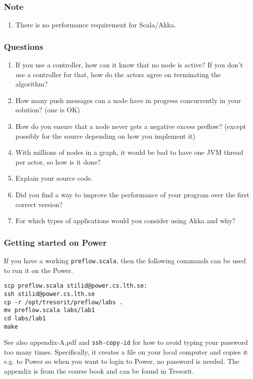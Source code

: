 \documentclass{forsete}
\begin{document}
\subsubsection*{Note}
\begin{enumerate}
\item There is no performance requirement for Scala/Akka.
\end{enumerate}

\subsubsection*{Questions}
\begin{enumerate}
\item If you use a controller, how can it know that no node is active? If you don't use a controller for that, how do the actors agree on
terminating the algorithm?
\item How many push messages can a node have in progress concurrently in your solution? (one is OK)
\item How do you ensure that a node never gets a negative excess preflow? (except possibly for the source depending on how you implement it)
\item With millions of nodes in a graph, it would be bad to have one JVM thread per actor, so how is it done?
\item Explain your source code.
\item Did you find a way to improve the performance of your program over the first correct version?
\item For which types of applications would you consider using Akka and why?
\end{enumerate}

\subsubsection*{Getting started on Power}
If you have a working \verb!preflow.scala!, then the following commands can be used to run it on the Power.
\begin{verbatim}
scp preflow.scala stilid@power.cs.lth.se:
ssh stilid@power.cs.lth.se
cp -r /opt/tresorit/preflow/labs .
mv preflow.scala labs/lab1
cd labs/lab1
make
\end{verbatim}

See also appendix-A.pdf and \verb!ssh-copy-id! for how to avoid typing your password too many times. Specifically, it creates a file on your local computer and copies it e.g. to Power so when you want to login to Power, no password is needed. The appendix is from the course book and can be found in Tresorit.
\end{document}
